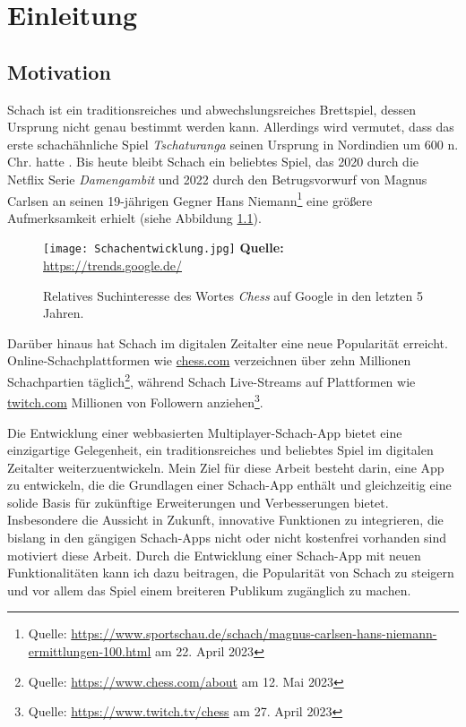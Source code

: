 
\chapter{Einleitung}
    \section{Motivation}
    Schach ist ein traditionsreiches und abwechslungsreiches Brettspiel, dessen Ursprung nicht genau bestimmt werden kann. Allerdings wird vermutet, dass das erste schachähnliche Spiel  \textit{Tschaturanga} seinen Ursprung in Nordindien um 600 n. Chr. hatte \cite{schachgeschichte}. Bis heute bleibt Schach ein beliebtes Spiel, das 2020 durch die Netflix Serie \textit{Damengambit} und 2022 durch den Betrugsvorwurf von Magnus Carlsen an seinen 19-jährigen Gegner Hans Niemann\footnote{Quelle: \url{https://www.sportschau.de/schach/magnus-carlsen-hans-niemann-ermittlungen-100.html} am 22. April 2023} eine größere Aufmerksamkeit erhielt (siehe Abbildung \ref{fig:Schachinteresse}). 
    
    \begin{figure}[ht]
\raggedleft
  \texttt{[image: Schachentwicklung.jpg]}
    \footnotesize\sffamily\textbf{Quelle:} \url{https://trends.google.de/}
  \caption{Relatives Suchinteresse des Wortes \textit{Chess} auf Google in den letzten 5 Jahren.}
  \label{fig:Schachinteresse}
\end{figure}

     Darüber hinaus hat Schach im digitalen Zeitalter eine neue Popularität erreicht. Online-Schachplattformen wie \url{chess.com} verzeichnen über zehn Millionen Schachpartien täglich\footnote{Quelle: \url{https://www.chess.com/about} am 12. Mai 2023}, während Schach Live-Streams auf Plattformen wie \url{twitch.com} Millionen von Followern anziehen\footnote{Quelle: \url{https://www.twitch.tv/chess} am 27. April 2023}.
     
Die Entwicklung einer webbasierten Multiplayer-Schach-App bietet eine einzigartige Gelegenheit, ein traditionsreiches und beliebtes Spiel im digitalen Zeitalter weiterzuentwickeln. Mein Ziel für diese Arbeit besteht darin, eine App zu entwickeln, die die Grundlagen einer Schach-App enthält und gleichzeitig eine solide Basis für zukünftige Erweiterungen und Verbesserungen bietet.
Insbesondere die Aussicht in Zukunft, innovative Funktionen zu integrieren, die bislang in den gängigen Schach-Apps nicht oder nicht kostenfrei vorhanden sind motiviert diese Arbeit. Durch die Entwicklung einer Schach-App mit neuen Funktionalitäten kann ich dazu beitragen, die Popularität von Schach zu steigern und vor allem das Spiel einem breiteren Publikum zugänglich zu machen.

